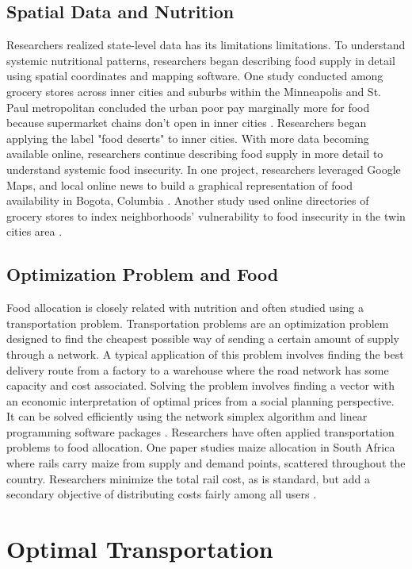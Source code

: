 \documentclass{report}
\begin{document}
\subsection{Spatial Data and Nutrition}

Researchers realized state-level data has its limitations limitations. To understand systemic nutritional patterns, researchers began describing food supply in detail using spatial coordinates and mapping software.  One study conducted among grocery stores across inner cities and suburbs within the Minneapolis and St. Paul metropolitan concluded the urban poor pay marginally more for food because supermarket chains don't open in inner cities \cite{Chung}. Researchers began applying the label "food deserts" to inner cities. With more data becoming available online, researchers continue describing food supply in more detail to understand systemic food insecurity. In one project, researchers leveraged Google Maps, and local online news to build a graphical representation of food availability in Bogota, Columbia \cite{Hwang}. Another study used online directories of grocery stores to index neighborhoods' vulnerability to food insecurity in the twin cities area \cite{Larson}.
 
\subsection{Optimization Problem and Food}

Food allocation is closely related with nutrition and often studied using a transportation problem. Transportation problems are an optimization problem designed to find the cheapest possible way of sending a certain amount of supply through a network. A typical application of this problem involves finding the best delivery route from a factory to a warehouse where the road network has some capacity and cost associated. Solving the problem involves finding a vector with an economic interpretation of optimal prices from a social planning perspective. It can be solved efficiently using the network simplex algorithm and linear programming software packages \cite{Cook}. Researchers have often applied transportation problems to food allocation. One paper studies maize allocation in South Africa where rails carry maize from supply and demand points, scattered throughout the country. Researchers minimize the total rail cost, as is standard, but add a secondary objective of distributing costs fairly among all users \cite{Stewart}.

\section{Optimal Transportation}
\end{document}
